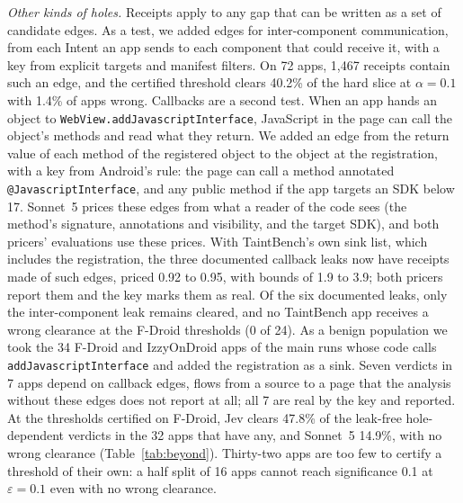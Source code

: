 \emph{Other kinds of holes.}
Receipts apply to any gap that can be written as a set of candidate edges.
As a test, we added edges for inter-component communication, from each Intent an app sends to each component that could receive it, with a key from explicit targets and manifest filters.
On 72 apps, 1{,}467 receipts contain such an edge, and the certified threshold clears 40.2\% of the hard slice at $\alpha=0.1$ with 1.4\% of apps wrong.
Callbacks are a second test.
When an app hands an object to \texttt{WebView.}\allowbreak\texttt{addJavascriptInterface}, JavaScript in the page can call the object's methods and read what they return.
We added an edge from the return value of each method of the registered object to the object at the registration, with a key from Android's rule: the page can call a method annotated \texttt{@JavascriptInterface}, and any public method if the app targets an SDK below 17.
Sonnet~5 prices these edges from what a reader of the code sees (the method's signature, annotations and visibility, and the target SDK), and both pricers' evaluations use these prices.
With TaintBench's own sink list, which includes the registration, the three documented callback leaks now have receipts made of such edges, priced 0.92 to 0.95, with bounds of 1.9 to 3.9; both pricers report them and the key marks them as real.
Of the six documented leaks, only the inter-component leak remains cleared, and no TaintBench app receives a wrong clearance at the F-Droid thresholds (0 of 24).
As a benign population we took the 34 F-Droid and IzzyOnDroid apps of the main runs whose code calls \texttt{addJavascriptInterface} and added the registration as a sink.
Seven verdicts in 7 apps depend on callback edges, flows from a source to a page that the analysis without these edges does not report at all; all 7 are real by the key and reported.
At the thresholds certified on F-Droid, Jev clears 47.8\% of the leak-free hole-dependent verdicts in the 32 apps that have any, and Sonnet~5 14.9\%, with no wrong clearance (Table~\ref{tab:beyond}).
Thirty-two apps are too few to certify a threshold of their own: a half split of 16 apps cannot reach significance 0.1 at $\varepsilon=0.1$ even with no wrong clearance.

